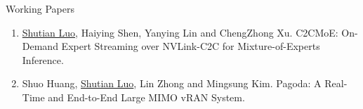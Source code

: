 \documentclass{resume} %
\begin{document}
\vspace{-1em}
\begin{rSection}{Working Papers}
\begin{enumerate}
    \setlength{\leftmargin}{0em}
    \setlength{\itemsep}{0.2em}
    \setlength{\parskip}{0pt}
    \item \underline{Shutian Luo}, Haiying Shen, Yanying Lin and ChengZhong Xu. C2CMoE: On-Demand Expert Streaming over NVLink-C2C for Mixture-of-Experts Inference.
  \item Shuo Huang, \underline{Shutian Luo}, Lin Zhong and  Mingsung Kim. Pagoda: A Real-Time and End-to-End Large MIMO vRAN System. 

\end{enumerate}



\end{rSection}
\end{document}
